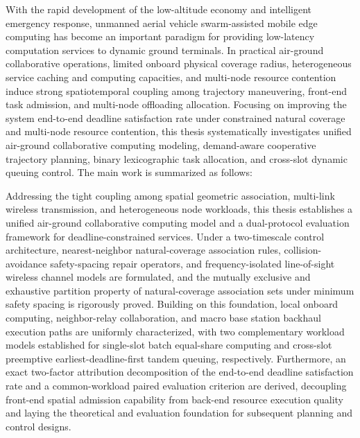 \begin{abstract*}
With the rapid development of the low-altitude economy and intelligent emergency response, unmanned aerial vehicle swarm-assisted mobile edge computing has become an important paradigm for providing low-latency computation services to dynamic ground terminals. In practical air-ground collaborative operations, limited onboard physical coverage radius, heterogeneous service caching and computing capacities, and multi-node resource contention induce strong spatiotemporal coupling among trajectory maneuvering, front-end task admission, and multi-node offloading allocation. Focusing on improving the system end-to-end deadline satisfaction rate under constrained natural coverage and multi-node resource contention, this thesis systematically investigates unified air-ground collaborative computing modeling, demand-aware cooperative trajectory planning, binary lexicographic task allocation, and cross-slot dynamic queuing control. The main work is summarized as follows:

Addressing the tight coupling among spatial geometric association, multi-link wireless transmission, and heterogeneous node workloads, this thesis establishes a unified air-ground collaborative computing model and a dual-protocol evaluation framework for deadline-constrained services. Under a two-timescale control architecture, nearest-neighbor natural-coverage association rules, collision-avoidance safety-spacing repair operators, and frequency-isolated line-of-sight wireless channel models are formulated, and the mutually exclusive and exhaustive partition property of natural-coverage association sets under minimum safety spacing is rigorously proved. Building on this foundation, local onboard computing, neighbor-relay collaboration, and macro base station backhaul execution paths are uniformly characterized, with two complementary workload models established for single-slot batch equal-share computing and cross-slot preemptive earliest-deadline-first tandem queuing, respectively. Furthermore, an exact two-factor attribution decomposition of the end-to-end deadline satisfaction rate and a common-workload paired evaluation criterion are derived, decoupling front-end spatial admission capability from back-end resource execution quality and laying the theoretical and evaluation foundation for subsequent planning and control designs.


\end{abstract*}
